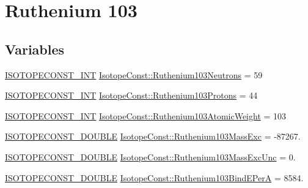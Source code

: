 \hypertarget{group___isotope_const-_ruthenium-_ru103}{}\section{Ruthenium 103}
\label{group___isotope_const-_ruthenium-_ru103}
\subsection*{Variables}
\begin{DoxyCompactItemize}
\item 
\mbox{\hyperlink{group___isotope_const-_macros_ga5f18360b3e99483a35c32d789e62621c}{I\+S\+O\+T\+O\+P\+E\+C\+O\+N\+S\+T\+\_\+\+I\+NT}} \mbox{\hyperlink{group___isotope_const-_ruthenium-_ru103_ga1e7618ed67f252e86db90f210a70c5ed}{Isotope\+Const\+::\+Ruthenium103\+Neutrons}} = 59
\item 
\mbox{\hyperlink{group___isotope_const-_macros_ga5f18360b3e99483a35c32d789e62621c}{I\+S\+O\+T\+O\+P\+E\+C\+O\+N\+S\+T\+\_\+\+I\+NT}} \mbox{\hyperlink{group___isotope_const-_ruthenium-_ru103_ga128bc9503dcae4bb137192a843697511}{Isotope\+Const\+::\+Ruthenium103\+Protons}} = 44
\item 
\mbox{\hyperlink{group___isotope_const-_macros_ga5f18360b3e99483a35c32d789e62621c}{I\+S\+O\+T\+O\+P\+E\+C\+O\+N\+S\+T\+\_\+\+I\+NT}} \mbox{\hyperlink{group___isotope_const-_ruthenium-_ru103_gab6d96ed6adda64ae4a37cb39aa914f9f}{Isotope\+Const\+::\+Ruthenium103\+Atomic\+Weight}} = 103
\item 
\mbox{\hyperlink{group___isotope_const-_macros_ga8f45a7272ce02c0b4c65c44636ed719a}{I\+S\+O\+T\+O\+P\+E\+C\+O\+N\+S\+T\+\_\+\+D\+O\+U\+B\+LE}} \mbox{\hyperlink{group___isotope_const-_ruthenium-_ru103_ga6d475b5025af0dd1efda96cb15260794}{Isotope\+Const\+::\+Ruthenium103\+Mass\+Exc}} = -\/87267.
\item 
\mbox{\hyperlink{group___isotope_const-_macros_ga8f45a7272ce02c0b4c65c44636ed719a}{I\+S\+O\+T\+O\+P\+E\+C\+O\+N\+S\+T\+\_\+\+D\+O\+U\+B\+LE}} \mbox{\hyperlink{group___isotope_const-_ruthenium-_ru103_ga79d59e641ffb2ad1a9a6390b1d3e69f6}{Isotope\+Const\+::\+Ruthenium103\+Mass\+Exc\+Unc}} = 0.
\item 
\mbox{\hyperlink{group___isotope_const-_macros_ga8f45a7272ce02c0b4c65c44636ed719a}{I\+S\+O\+T\+O\+P\+E\+C\+O\+N\+S\+T\+\_\+\+D\+O\+U\+B\+LE}} \mbox{\hyperlink{group___isotope_const-_ruthenium-_ru103_ga166cca5d48213cb60bc133f4d451402d}{Isotope\+Const\+::\+Ruthenium103\+Bind\+E\+PerA}} = 8584.
\item 

\end{DoxyCompactItemize}
